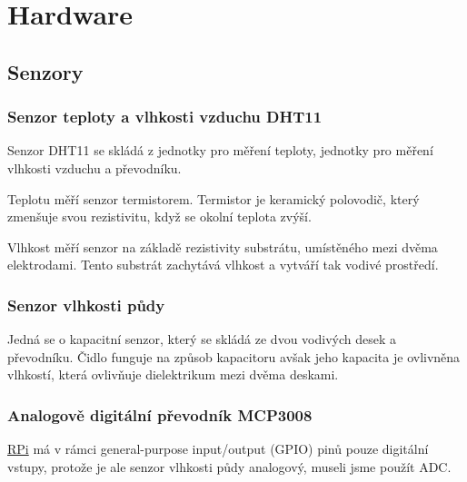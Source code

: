 \documentclass[czech,12pt,a4paper]{article}
\begin{document}
\clearpage

\section{Hardware} \label{secHardware}

\subsection{Senzory}

\subsubsection{Senzor teploty a vlhkosti vzduchu DHT11}

Senzor \ac{DHT11} se skládá z jednotky pro měření teploty, jednotky pro měření vlhkosti vzduchu a převodníku.

Teplotu měří senzor termistorem. Termistor je keramický polovodič, který zmenšuje svou rezistivitu, když se okolní teplota zvýší.

Vlhkost měří senzor na základě rezistivity substrátu, umístěného mezi dvěma elektrodami. Tento substrát zachytává vlhkost a vytváří tak vodivé prostředí.

\subsubsection{Senzor vlhkosti půdy}

Jedná se o kapacitní senzor, který se skládá ze dvou vodivých desek a převodníku. Čidlo funguje na způsob kapacitoru avšak jeho kapacita je ovlivněna vlhkostí, která ovlivňuje dielektrikum mezi dvěma deskami.

\subsubsection{Analogově digitální převodník MCP3008} \label{secADC}

\underline{\ac{RPi}} má v rámci general-purpose input/output (GPIO) pinů pouze digitální vstupy, protože je ale senzor vlhkosti půdy analogový, museli jsme použít \ac{ADC}.
\end{document}
